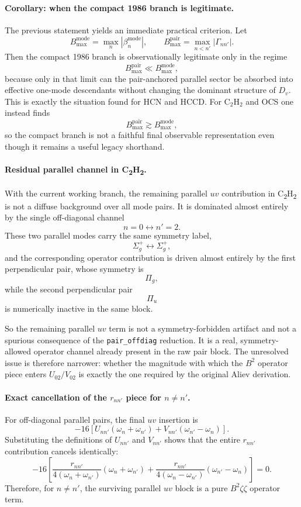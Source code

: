 \documentclass[11pt]{article}
\begin{document}
\paragraph{Corollary: when the compact 1986 branch is legitimate.}
The previous statement yields an immediate practical criterion. Let
\[
B_{\max}^{\mathrm{mode}}=\max_n |\beta_n^{\mathrm{mode}}|,
\qquad
B_{\max}^{\mathrm{pair}}=\max_{n<n'} |\Gamma_{nn'}|.
\]
Then the compact 1986 branch is observationally legitimate only in the regime
\[
B_{\max}^{\mathrm{pair}} \ll B_{\max}^{\mathrm{mode}},
\]
because only in that limit can the pair-anchored parallel sector be absorbed
into effective one-mode descendants without changing the dominant structure of
$D_v$. This is exactly the situation found for HCN and HCCD. For
C$_2$H$_2$ and OCS one instead finds
\[
B_{\max}^{\mathrm{pair}} \gtrsim B_{\max}^{\mathrm{mode}},
\]
so the compact branch is not a faithful final observable representation even
though it remains a useful legacy shorthand.

\paragraph{Residual parallel channel in \texorpdfstring{C\textsubscript{2}H\textsubscript{2}}{C2H2}.}
With the current working branch, the remaining parallel $uv$ contribution in
\texorpdfstring{C\textsubscript{2}H\textsubscript{2}}{C2H2} is not a diffuse
background over all mode pairs. It is dominated almost entirely by the single
off-diagonal channel
\[
n=0 \longleftrightarrow n'=2.
\]
These two parallel modes carry the same symmetry label,
\[
\Sigma_g^+ \longleftrightarrow \Sigma_g^+,
\]
and the corresponding operator contribution is driven almost entirely by the
first perpendicular pair, whose symmetry is
\[
\Pi_g,
\]
while the second perpendicular pair
\[
\Pi_u
\]
is numerically inactive in the same block.

So the remaining parallel $uv$ term is not a symmetry-forbidden artifact and
not a spurious consequence of the \texttt{pair\_offdiag} reduction. It is a
real, symmetry-allowed operator channel already present in the raw pair block.
The unresolved issue is therefore narrower: whether the magnitude with which
the $B^2$ operator piece enters $U_{02}/V_{02}$ is exactly the one required by
the original Aliev derivation.

\paragraph{Exact cancellation of the \texorpdfstring{$r_{nn'}$}{rnn'} piece for \texorpdfstring{$n\neq n'$}{n neq n'}.}
For off-diagonal parallel pairs, the final $uv$ insertion is
\[
-16\left[U_{nn'}(\omega_n+\omega_{n'}) + V_{nn'}(\omega_{n'}-\omega_n)\right].
\]
Substituting the definitions of $U_{nn'}$ and $V_{nn'}$ shows that the entire
$r_{nn'}$ contribution cancels identically:
\[
-16\left[
\frac{r_{nn'}}{4(\omega_n+\omega_{n'})}(\omega_n+\omega_{n'})
+
\frac{r_{nn'}}{4(\omega_n-\omega_{n'})}(\omega_{n'}-\omega_n)
\right]=0.
\]
Therefore, for $n\neq n'$, the surviving parallel $uv$ block is a pure
$B^2\zeta\zeta$ operator term.
\end{document}
